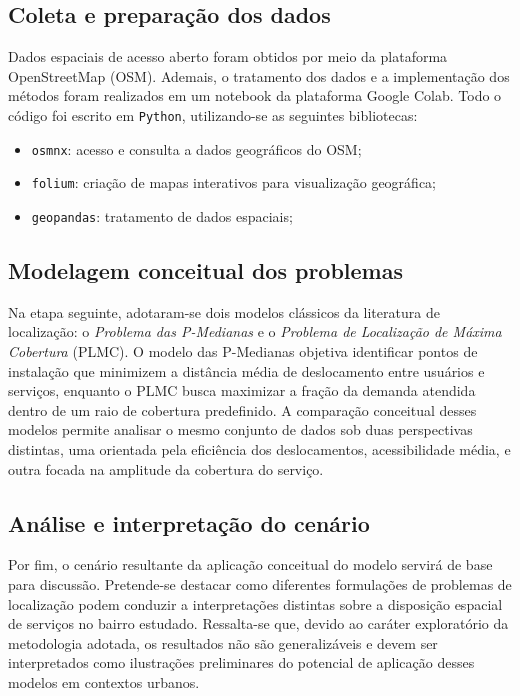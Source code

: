 \documentclass[12pt]{article}
\begin{document}
\subsection{Coleta e preparação dos dados}

Dados espaciais de acesso aberto foram obtidos por meio da plataforma OpenStreetMap (OSM). Ademais, o tratamento dos dados e a implementação dos métodos foram realizados em um notebook da plataforma Google Colab. Todo o código foi escrito em \texttt{Python}, utilizando-se as seguintes bibliotecas:

\begin{itemize}
    \item \texttt{osmnx}: acesso e consulta a dados geográficos do OSM;
    \item \texttt{folium}: criação de mapas interativos para visualização geográfica;
    \item \texttt{geopandas}: tratamento de dados espaciais;
\end{itemize}

\subsection{Modelagem conceitual dos problemas}

Na etapa seguinte, adotaram-se dois modelos clássicos da literatura de localização: o \emph{Problema das P-Medianas} e o \emph{Problema de Localização de Máxima Cobertura} (PLMC). O modelo das P-Medianas objetiva identificar pontos de instalação que minimizem a distância média de deslocamento entre usuários e serviços, enquanto o PLMC busca maximizar a fração da demanda atendida dentro de um raio de cobertura predefinido. A comparação conceitual desses modelos permite analisar o mesmo conjunto de dados sob duas perspectivas distintas, uma orientada pela eficiência dos deslocamentos, acessibilidade média, e outra focada na amplitude da cobertura do serviço.

\subsection{Análise e interpretação do cenário}

Por fim, o cenário resultante da aplicação conceitual do modelo servirá de base para discussão. Pretende-se destacar como diferentes formulações de problemas de localização podem conduzir a interpretações distintas sobre a disposição espacial de serviços no bairro estudado. Ressalta-se que, devido ao caráter exploratório da metodologia adotada, os resultados não são generalizáveis e devem ser interpretados como ilustrações preliminares do potencial de aplicação desses modelos em contextos urbanos.
\end{document}
